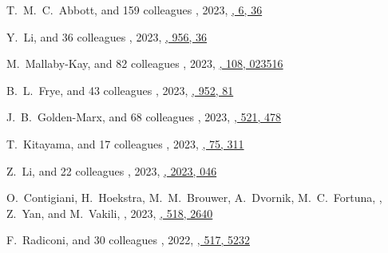 \begin{etaremune}
\item
T.~M.~C.~Abbott, and 159 colleagues
,
2023, \href{https://ui.adsabs.harvard.edu/abs/2023OJAp....6E..36A}{\oja, 6, 36}

\item
Y.~Li, and 36 colleagues
,
2023, \href{https://ui.adsabs.harvard.edu/abs/2023ApJ...956...36L}{\apj, 956, 36}

\item
M.~Mallaby-Kay, and 82 colleagues
,
2023, \href{https://ui.adsabs.harvard.edu/abs/2023PhRvD.108b3516M}{\prd, 108, 023516}

\item
B.~L.~Frye, and 43 colleagues
,
2023, \href{https://ui.adsabs.harvard.edu/abs/2023ApJ...952...81F}{\apj, 952, 81}

\item
J.~B.~Golden-Marx, and 68 colleagues
,
2023, \href{https://ui.adsabs.harvard.edu/abs/2023MNRAS.521..478G}{\mnras, 521, 478}

\item
T.~Kitayama, and 17 colleagues
,
2023, \href{https://ui.adsabs.harvard.edu/abs/2023PASJ...75..311K}{\pasj, 75, 311}

\item
Z.~Li, and 22 colleagues
,
2023, \href{https://ui.adsabs.harvard.edu/abs/2023JCAP...02..046L}{\jcap, 2023, 046}

\item
O.~Contigiani, H.~Hoekstra, M.~M.~Brouwer, A.~Dvornik, M.~C.~Fortuna, \myself, Z.~Yan, and M.~Vakili,
,
2023, \href{https://ui.adsabs.harvard.edu/abs/2023MNRAS.518.2640C}{\mnras, 518, 2640}


\item
F.~Radiconi, and 30 colleagues
,
2022, \href{https://ui.adsabs.harvard.edu/abs/2022MNRAS.517.5232R}{\mnras, 517, 5232}


\end{etaremune}
